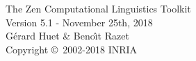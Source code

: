 \documentclass[12pt]{article}
\begin{document}


\def\lbr{\langle} %
\def\rbr{\rangle} %
\def\lsq{[} %
\def\rsq{]} %
\def\R{{\cal R}} %
\def\otrema{\"o} %
\def\skip{\vspace{10pt}}


\begin{center}
\vspace*{24pt}
{\Large The Zen Computational Linguistics Toolkit}\\[10pt]
{\Large Version 5.1 - November 25th, 2018}\\[15pt]
{\large G\'erard Huet \& Beno{\^\i}t Razet}\\[10pt]
{\large Copyright \copyright ~2002-2018 INRIA}\\[20pt]
\end{center}
\end{document}
